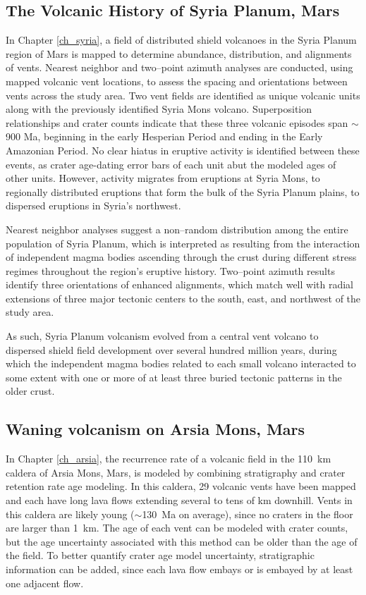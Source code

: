 \subsection{The Volcanic History of Syria Planum, Mars}
In Chapter \ref{ch_syria}, a field of distributed shield volcanoes in the Syria Planum region of Mars is mapped to determine abundance, distribution, and alignments of vents. Nearest neighbor and two--point azimuth analyses are conducted, using mapped volcanic vent locations, to assess the spacing and orientations between vents across the study area. Two vent fields are identified as unique volcanic units along with the previously identified Syria Mons volcano. Superposition relationships and crater counts indicate that these three volcanic episodes span $\sim$900 Ma, beginning in the early Hesperian Period and ending in the Early Amazonian Period. No clear hiatus in eruptive activity is identified between these events, as crater age-dating error bars of each unit abut the modeled ages of other units. However, activity migrates from eruptions at Syria Mons, to regionally distributed eruptions that form the bulk of the Syria Planum plains, to dispersed eruptions in Syria's northwest. 

Nearest neighbor analyses suggest a non--random distribution among the entire population of Syria Planum, which is interpreted as resulting from the interaction of independent magma bodies ascending through the crust during different stress regimes throughout the region's eruptive history. Two--point azimuth results identify three orientations of enhanced alignments, which match well with radial extensions of three major tectonic centers to the south, east, and northwest of the study area. 

As such, Syria Planum volcanism evolved from a central vent volcano to dispersed shield field development over several hundred million years, during which the independent magma bodies related to each small volcano interacted to some extent with one or more of at least three buried tectonic patterns in the older crust.


\subsection{Waning volcanism on Arsia Mons, Mars}
In Chapter \ref{ch_arsia}, the recurrence rate of a volcanic field in the 110~km caldera of Arsia Mons, Mars, is modeled by combining stratigraphy and crater retention rate age modeling. In this caldera, 29 volcanic vents have been mapped and each have long lava flows extending several to tens of km downhill. Vents in this caldera are likely young ($\sim$130~Ma on average), since no craters in the floor are larger than 1~km. The age of each vent can be modeled with crater counts, but the age uncertainty associated with this method can be older than the age of the field. To better quantify crater age model uncertainty, stratigraphic information can be added, since each lava flow embays or is embayed by at least one adjacent flow.

